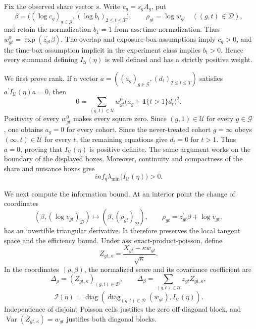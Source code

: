 Fix the observed share vector \(s\).  Write \(c_g=s_gA_g\), put
\[
 \beta=\bigl((\log c_g)_{g\in\mathcal G},(\log b_t)_{2\leq t\leq T}\bigr),
 \qquad \rho_{gt}=\log w_{gt}\quad ((g,t)\in\mathcal D),
\]
and retain the normalization \(b_1=1\) from
\(\mathrm{ass{:}time\text{-}normalization}\).  Thus
\(w^0_{gt}=\exp(z_{gt}^{\prime}\beta)\).  The overlap and exposure-box
assumptions imply \(c_g>0\), and the time-box assumption implicit in the
experiment class implies \(b_t>0\).  Hence every summand defining
\(I_{\mathcal U}(\eta)\) is well defined and has a strictly positive weight.

We first prove rank.  If a vector
\(a=((a_g)_{g\in\mathcal G},(d_t)_{2\leq t\leq T})\) satisfies
\(a^{\prime}I_{\mathcal U}(\eta)a=0\), then
\[
 0=\sum_{(g,t)\in\mathcal U}w^0_{gt}
       \bigl(a_g+\mathbf 1\{t>1\}d_t\bigr)^2.
\]
Positivity of every \(w^0_{gt}\) makes every square zero.  Since
\((g,1)\in\mathcal U\) for every \(g\in\mathcal G\), one obtains
\(a_g=0\) for every cohort.  Since the never-treated cohort
\(g=\infty\) obeys \((\infty,t)\in\mathcal U\) for every \(t\), the
remaining equations give \(d_t=0\) for \(t>1\).  Thus \(a=0\), proving
that \(I_{\mathcal U}(\eta)\) is positive definite.  The same argument
works on the boundary of the displayed boxes.  Moreover, continuity and
compactness of the share and nuisance boxes give
\[
 inf_{\eta}\lambda_{\min}\bigl(I_{\mathcal U}(\eta)\bigr)>0.
\]

We next compute the information bound.  At an interior point the change of
coordinates
\[
  (\beta,(\log v_{gt})_{\mathcal D})
    \longmapsto (\beta,(\rho_{gt})_{\mathcal D}),
 \qquad
  \rho_{gt}=z_{gt}^{\prime}\beta+\log v_{gt},
\]
has an invertible triangular derivative.  It therefore preserves the local
tangent space and the efficiency bound.  Under
\(\mathrm{ass{:}exact\text{-}product\text{-}poisson}\), define
\[
 Z_{gt,\kappa}=\frac{X_{gt}-\kappa w_{gt}}{\sqrt\kappa}.
\]
In the coordinates \((\rho,\beta)\), the normalized score and its covariance
coefficient are
\[
 \Delta_{\rho}= (Z_{gt,\kappa})_{(g,t)\in\mathcal D},
 \qquad
 \Delta_{\beta}=\sum_{(g,t)\in\mathcal U}z_{gt}Z_{gt,\kappa},
\]
\[
 \mathcal I(\eta)=
 \operatorname{diag}\!\left(
   \operatorname{diag}_{(g,t)\in\mathcal D}(w_{gt}),
   I_{\mathcal U}(\eta)
 \right).
\]
Independence of disjoint Poisson cells justifies the zero off-diagonal
block, and \(\operatorname{Var}(Z_{gt,\kappa})=w_{gt}\) justifies both
diagonal blocks.

